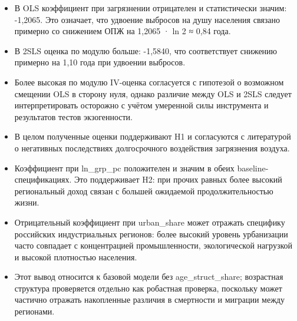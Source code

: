 \documentclass[11pt,a4paper]{article}
\begin{document}
\begin{itemize}
\item В OLS коэффициент при загрязнении отрицателен и статистически значим: -1,2065. Это означает, что удвоение выбросов на душу населения связано примерно со снижением ОПЖ на 1,2065 · ln 2 ≈ 0,84 года.
\item В 2SLS оценка по модулю больше: -1,5840, что соответствует снижению примерно на 1,10 года при удвоении выбросов.
\item Более высокая по модулю IV-оценка согласуется с гипотезой о возможном смещении OLS в сторону нуля, однако различие между OLS и 2SLS следует интерпретировать осторожно с учётом умеренной силы инструмента и результатов тестов экзогенности.
\item В целом полученные оценки поддерживают H1 и согласуются с литературой о негативных последствиях долгосрочного воздействия загрязнения воздуха.
\item Коэффициент при ln\_grp\_pc положителен и значим в обеих baseline-спецификациях. Это поддерживает H2: при прочих равных более высокий региональный доход связан с большей ожидаемой продолжительностью жизни.
\item Отрицательный коэффициент при urban\_share может отражать специфику российских индустриальных регионов: более высокий уровень урбанизации часто совпадает с концентрацией промышленности, экологической нагрузкой и высокой плотностью населения.
\item Этот вывод относится к базовой модели без age\_struct\_share; возрастная структура проверяется отдельно как робастная проверка, поскольку может частично отражать накопленные различия в смертности и миграции между регионами.
\end{itemize}
\end{document}
